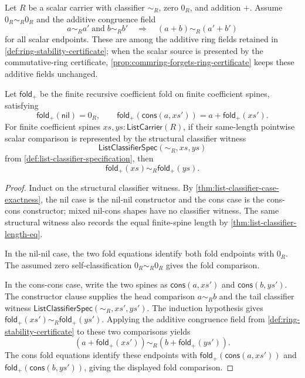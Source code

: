 \begin{theorem}
\label{thm:finite-additive-fold-congruence-coefficient-lists}
Let \(R\) be a scalar carrier with classifier \(\sim_R\), zero \(0_R\), and addition \(+\). Assume \(0_R\sim_R0_R\) and the additive congruence field
$$
a\sim_R a' \;\text{and}\; b\sim_R b'
\quad\Longrightarrow\quad
(a+b)\sim_R(a'+b')
$$
for all scalar endpoints. These are among the additive ring fields retained in \autoref{def:ring-stability-certificate}; when the scalar source is presented by the commutative-ring certificate, \autoref{prop:commring-forgets-ring-certificate} keeps these additive fields unchanged.

Let \(\mathsf{fold}_{+}\) be the finite recursive coefficient fold on finite coefficient spines, satisfying
$$
\mathsf{fold}_{+}(\mathsf{nil})=0_R,
\qquad
\mathsf{fold}_{+}(\mathsf{cons}(a,xs'))=a+\mathsf{fold}_{+}(xs').
$$
For finite coefficient spines \(xs,ys:\mathsf{ListCarrier}(R)\), if their same-length pointwise scalar comparison is represented by the structural classifier witness
$$
\mathsf{ListClassifierSpec}(\sim_R,xs,ys)
$$
from \autoref{def:list-classifier-specification}, then
$$
\mathsf{fold}_{+}(xs)\sim_R\mathsf{fold}_{+}(ys).
$$
\end{theorem}
\begin{proof}
Induct on the structural classifier witness. By \autoref{thm:list-classifier-case-exactness}, the nil case is the nil-nil constructor and the cons case is the cons-cons constructor; mixed nil-cons shapes have no classifier witness. The same structural witness also records the equal finite-spine length by \autoref{thm:list-classifier-length-eq}.

In the nil-nil case, the two fold equations identify both fold endpoints with \(0_R\). The assumed zero self-classification \(0_R\sim_R0_R\) gives the fold comparison.

In the cons-cons case, write the two spines as \(\mathsf{cons}(a,xs')\) and \(\mathsf{cons}(b,ys')\). The constructor clause supplies the head comparison \(a\sim_R b\) and the tail classifier witness \(\mathsf{ListClassifierSpec}(\sim_R,xs',ys')\). The induction hypothesis gives \(\mathsf{fold}_{+}(xs')\sim_R\mathsf{fold}_{+}(ys')\). Applying the additive congruence field from \autoref{def:ring-stability-certificate} to these two comparisons yields
$$
(a+\mathsf{fold}_{+}(xs'))\sim_R(b+\mathsf{fold}_{+}(ys')).
$$
The cons fold equations identify these endpoints with \(\mathsf{fold}_{+}(\mathsf{cons}(a,xs'))\) and \(\mathsf{fold}_{+}(\mathsf{cons}(b,ys'))\), giving the displayed fold comparison.
\end{proof}

